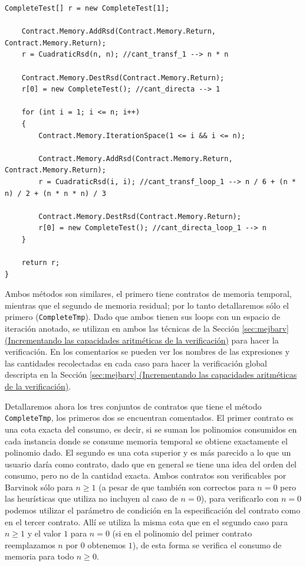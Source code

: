 \documentclass[12pt,a4paper]{article}
\newcommand\mono[1]{\texttt{#1}}
\begin{document}
\begin{footnotesize}
\begin{lstlisting}[caption=Métodos con contratos con polinomios]
	CompleteTest[] r = new CompleteTest[1];

	Contract.Memory.AddRsd(Contract.Memory.Return, Contract.Memory.Return);
	r = CuadraticRsd(n, n); //cant_transf_1 --> n * n

	Contract.Memory.DestRsd(Contract.Memory.Return);
	r[0] = new CompleteTest(); //cant_directa --> 1

	for (int i = 1; i <= n; i++)
	{
		Contract.Memory.IterationSpace(1 <= i && i <= n);

		Contract.Memory.AddRsd(Contract.Memory.Return, Contract.Memory.Return);
		r = CuadraticRsd(i, i); //cant_transf_loop_1 --> n / 6 + (n * n) / 2 + (n * n * n) / 3

		Contract.Memory.DestRsd(Contract.Memory.Return);
		r[0] = new CompleteTest(); //cant_directa_loop_1 --> n
	}

	return r;
}
			\end{lstlisting}
			\end{footnotesize}

			Ambos métodos son similares, el primero tiene contratos de memoria temporal, mientras que el segundo de memoria residual; por lo tanto detallaremos sólo el primero (\mono{CompleteTmp}). Dado que ambos tienen sus loops con un espacio de iteración anotado, se utilizan en ambos las técnicas de la Sección \hyperref[sec:mejbarv]{\ref*{sec:mejbarv} (Incrementando las capacidades aritméticas de la verificación)} para hacer la verificación. En los comentarios se pueden ver los nombres de las expresiones y las cantidades recolectadas en cada caso para hacer la verificación global descripta en la Sección \hyperref[sec:mejbarv]{\ref*{sec:mejbarv} (Incrementando las capacidades aritméticas de la verificación)}.

			Detallaremos ahora los tres conjuntos de contratos que tiene el método \mono{CompleteTmp}, los primeros dos se encuentran comentados. El primer contrato es una cota exacta del consumo, es decir, si se suman los polinomios consumidos en cada instancia donde se consume memoria temporal se obtiene exactamente el polinomio dado. El segundo es una cota superior y es más parecido a lo que un usuario daría como contrato, dado que en general se tiene una idea del orden del consumo, pero no de la cantidad exacta. Ambos contratos son verificables por Barvinok sólo para $n \geq 1$ (a pesar de que también son correctos para $n = 0$ pero las heurísticas que utiliza no incluyen al caso de $n = 0$), para verificarlo con $n = 0$ podemos utilizar el parámetro de condición en la especificación del contrato como en el tercer contrato. Allí se utiliza la misma cota que en el segundo caso para $n \geq 1$ y el valor $1$ para $n = 0$ (si en el polinomio del primer contrato reemplazamos $n$ por $0$ obtenemos $1$), de esta forma se verifica el consumo de memoria para todo $n \geq 0$.
\end{document}
